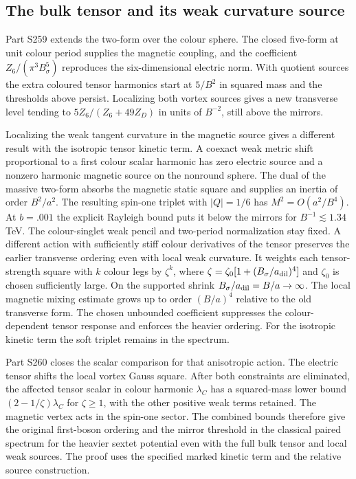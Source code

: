 \documentclass[aps,prd,reprint,onecolumn,nofootinbib,amsmath,amssymb]{revtex4-2}
\begin{document}
\subsection{The bulk tensor and its weak curvature source}

Part S259 extends the two-form over the colour sphere. The closed five-form at unit colour period supplies the magnetic coupling, and the coefficient $Z_6/(\pi^3B_\sigma^5)$ reproduces the six-dimensional electric norm. With quotient sources the extra coloured tensor harmonics start at $5/B^2$ in squared mass and the thresholds above persist. Localizing both vortex sources gives a new transverse level tending to $5Z_6/(Z_6+49Z_D)$ in units of $B^{-2}$, still above the mirrors.

Localizing the weak tangent curvature in the magnetic source gives a different result with the isotropic tensor kinetic term. A coexact weak metric shift proportional to a first colour scalar harmonic has zero electric source and a nonzero harmonic magnetic source on the nonround sphere. The dual of the massive two-form absorbs the magnetic static square and supplies an inertia of order $B^2/a^2$. The resulting spin-one triplet with $|Q|=1/6$ has $M^2=O(a^2/B^4)$. At $b=.001$ the explicit Rayleigh bound puts it below the mirrors for $B^{-1}\lesssim1.34$ TeV. The colour-singlet weak pencil and two-period normalization stay fixed. A different action with sufficiently stiff colour derivatives of the tensor preserves the earlier transverse ordering even with local weak curvature. It weights each tensor-strength square with $k$ colour legs by $\zeta^k$, where $\zeta=\zeta_0[1+(B_\sigma/a_{\rm dil})^4]$ and $\zeta_0$ is chosen sufficiently large. On the supported shrink $B_\sigma/a_{\rm dil}=B/a\to\infty$. The local magnetic mixing estimate grows up to order $(B/a)^4$ relative to the old transverse form. The chosen unbounded coefficient suppresses the colour-dependent tensor response and enforces the heavier ordering. For the isotropic kinetic term the soft triplet remains in the spectrum.

Part S260 closes the scalar comparison for that anisotropic action. The electric tensor shifts the local vortex Gauss square. After both constraints are eliminated, the affected tensor scalar in colour harmonic $\lambda_C$ has a squared-mass lower bound $(2-1/\zeta)\lambda_C$ for $\zeta\ge1$, with the other positive weak terms retained. The magnetic vertex acts in the spin-one sector. The combined bounds therefore give the original first-boson ordering and the mirror threshold in the classical paired spectrum for the heavier sextet potential even with the full bulk tensor and local weak sources. The proof uses the specified marked kinetic term and the relative source construction.
\end{document}
